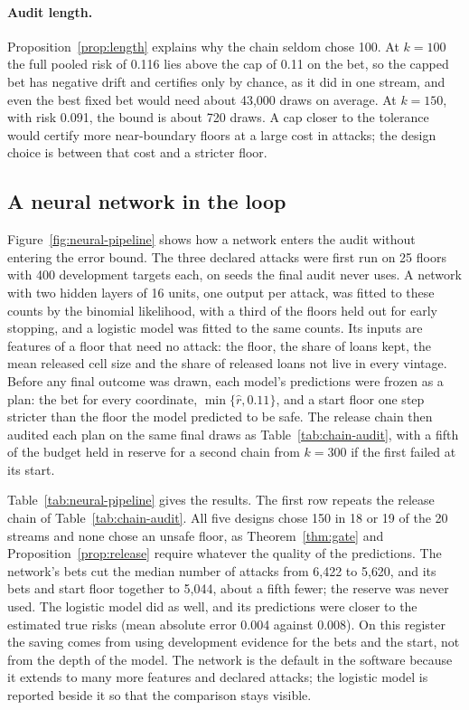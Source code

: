 \paragraph{Audit length.} Proposition~\ref{prop:length} explains why the chain seldom chose 100. At $k=100$ the full pooled risk of 0.116 lies above the cap of 0.11 on the bet, so the capped bet has negative drift and certifies only by chance, as it did in one stream, and even the best fixed bet would need about 43{,}000 draws on average. At $k=150$, with risk 0.091, the bound is about 720 draws. A cap closer to the tolerance would certify more near-boundary floors at a large cost in attacks; the design choice is between that cost and a stricter floor.

\subsection{A neural network in the loop}\label{sec:neural-run}
Figure~\ref{fig:neural-pipeline} shows how a network enters the audit without entering the error bound. The three declared attacks were first run on 25 floors with 400 development targets each, on seeds the final audit never uses. A network with two hidden layers of 16 units, one output per attack, was fitted to these counts by the binomial likelihood, with a third of the floors held out for early stopping, and a logistic model was fitted to the same counts. Its inputs are features of a floor that need no attack: the floor, the share of loans kept, the mean released cell size and the share of released loans not live in every vintage. Before any final outcome was drawn, each model's predictions were frozen as a plan: the bet for every coordinate, $\min\{\hat r,0.11\}$, and a start floor one step stricter than the floor the model predicted to be safe. The release chain then audited each plan on the same final draws as Table~\ref{tab:chain-audit}, with a fifth of the budget held in reserve for a second chain from $k=300$ if the first failed at its start.




Table~\ref{tab:neural-pipeline} gives the results. The first row repeats the release chain of Table~\ref{tab:chain-audit}. All five designs chose 150 in 18 or 19 of the 20 streams and none chose an unsafe floor, as Theorem~\ref{thm:gate} and Proposition~\ref{prop:release} require whatever the quality of the predictions. The network's bets cut the median number of attacks from 6{,}422 to 5{,}620, and its bets and start floor together to 5{,}044, about a fifth fewer; the reserve was never used. The logistic model did as well, and its predictions were closer to the estimated true risks (mean absolute error 0.004 against 0.008). On this register the saving comes from using development evidence for the bets and the start, not from the depth of the model. The network is the default in the software because it extends to many more features and declared attacks; the logistic model is reported beside it so that the comparison stays visible.

